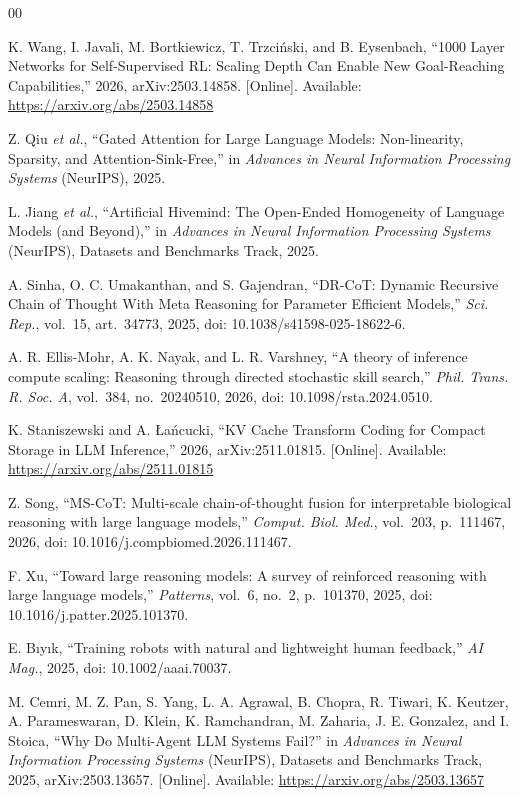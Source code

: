 \documentclass[conference]{IEEEtran}
\begin{document}
\begin{thebibliography}{00}

K. Wang, I. Javali, M. Bortkiewicz, T. Trzci\'{n}ski, and B. Eysenbach, ``1000 Layer Networks for Self-Supervised RL: Scaling Depth Can Enable New Goal-Reaching Capabilities,'' 2026, arXiv:2503.14858. [Online]. Available: \url{https://arxiv.org/abs/2503.14858}

Z. Qiu \emph{et al.}, ``Gated Attention for Large Language Models: Non-linearity, Sparsity, and Attention-Sink-Free,'' in \emph{Advances in Neural Information Processing Systems} (NeurIPS), 2025.

L. Jiang \emph{et al.}, ``Artificial Hivemind: The Open-Ended Homogeneity of Language Models (and Beyond),'' in \emph{Advances in Neural Information Processing Systems} (NeurIPS), Datasets and Benchmarks Track, 2025.

A. Sinha, O. C. Umakanthan, and S. Gajendran, ``DR-CoT: Dynamic Recursive Chain of Thought With Meta Reasoning for Parameter Efficient Models,'' \emph{Sci. Rep.}, vol.~15, art.~34773, 2025, doi: 10.1038/s41598-025-18622-6.

A. R. Ellis-Mohr, A. K. Nayak, and L. R. Varshney, ``A theory of inference compute scaling: Reasoning through directed stochastic skill search,'' \emph{Phil. Trans. R. Soc. A}, vol.~384, no.~20240510, 2026, doi: 10.1098/rsta.2024.0510.

K. Staniszewski and A. {\L}a\'{n}cucki, ``KV Cache Transform Coding for Compact Storage in LLM Inference,'' 2026, arXiv:2511.01815. [Online]. Available: \url{https://arxiv.org/abs/2511.01815}

Z. Song, ``MS-CoT: Multi-scale chain-of-thought fusion for interpretable biological reasoning with large language models,'' \emph{Comput. Biol. Med.}, vol.~203, p.~111467, 2026, doi: 10.1016/j.compbiomed.2026.111467.

F. Xu, ``Toward large reasoning models: A survey of reinforced reasoning with large language models,'' \emph{Patterns}, vol.~6, no.~2, p.~101370, 2025, doi: 10.1016/j.patter.2025.101370.

E. B{\i}y{\i}k, ``Training robots with natural and lightweight human feedback,'' \emph{AI Mag.}, 2025, doi: 10.1002/aaai.70037.

M. Cemri, M. Z. Pan, S. Yang, L. A. Agrawal, B. Chopra, R. Tiwari, K. Keutzer, A. Parameswaran, D. Klein, K. Ramchandran, M. Zaharia, J. E. Gonzalez, and I. Stoica, ``Why Do Multi-Agent LLM Systems Fail?'' in \emph{Advances in Neural Information Processing Systems} (NeurIPS), Datasets and Benchmarks Track, 2025, arXiv:2503.13657. [Online]. Available: \url{https://arxiv.org/abs/2503.13657}

\end{thebibliography}
\end{document}
